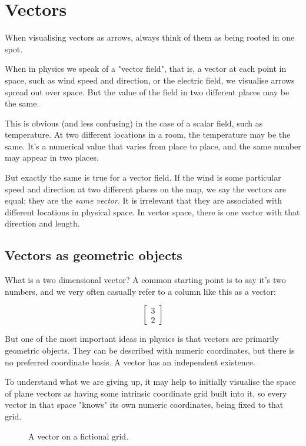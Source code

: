 \chapter{Vectors} \label{ch:vectors}

When visualising vectors as arrows, always think of them as being rooted in one spot.

When in physics we speak of a "vector field", that is, a vector at each point in space, such as wind speed and direction, or the electric field, we visualise arrows spread out over space. But the value of the field in two different places may be the same.

This is obvious (and less confusing) in the case of a scalar field, such as temperature. At two different locations in a room, the temperature may be the same. It's a numerical value that varies from place to place, and the same number may appear in two places.

But exactly the same is true for a vector field. If the wind is some particular speed and direction at two different places on the map, we say the vectors are equal: they are the \textit{same vector}. It is irrelevant that they are associated with different locations in physical space. In vector space, there is one vector with that direction and length.

\section{Vectors as geometric objects}\label{sec:vectors-geometric}

What is a two dimensional vector? A common starting point is to say it's two numbers, and we very often casually refer to a column like this as a vector:

$$
\begin{bmatrix}3 \\ 2\end{bmatrix}
$$

But one of the most important ideas in physics is that vectors are primarily geometric objects. They can be described with numeric coordinates, but there is no preferred coordinate basis. A vector has an independent existence.

To understand what we are giving up, it may help to initially visualise the space of plane vectors as having some intrinsic coordinate grid built into it, so every vector in that space "knows" its own numeric coordinates, being fixed to that grid.

\begin{figure}[h]
    \centering
    \caption{A vector on a fictional grid.} \label{fig:vector-grid}
\end{figure}

